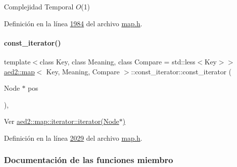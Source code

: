 \begin{DoxyDescription}
\item[Complejidad Temporal]$O$(1)
\end{DoxyDescription}

Definición en la línea \hyperlink{map_8h_source_l01984}{1984} del archivo \hyperlink{map_8h_source}{map.\+h}.

\mbox{\label{classaed2_1_1map_1_1const__iterator_a195d395708167dca23f9ce49f7c604f3_a195d395708167dca23f9ce49f7c604f3}} 
\paragraph{\texorpdfstring{const\+\_\+iterator()}{const\_iterator()}\hspace{0.1cm}{\footnotesize\ttfamily [3/3]}}
{\footnotesize\ttfamily template$<$class Key, class Meaning, class Compare = std\+::less$<$\+Key$>$$>$ \\
\hyperlink{classaed2_1_1map}{aed2\+::map}$<$ Key, Meaning, Compare $>$\+::const\+\_\+iterator\+::const\+\_\+iterator (\begin{DoxyParamCaption}\item[{Node $\ast$}]{pos }\end{DoxyParamCaption})\hspace{0.3cm}{\ttfamily [inline]}, {\ttfamily [private]}}



Ver \hyperlink{classaed2_1_1map_1_1iterator_ab0ea21abcb32b6d5a72cf341b9029838_ab0ea21abcb32b6d5a72cf341b9029838}{aed2\+::map\+::iterator\+::iterator(\+Node$\ast$)} 



Definición en la línea \hyperlink{map_8h_source_l02029}{2029} del archivo \hyperlink{map_8h_source}{map.\+h}.



\subsubsection{Documentación de las funciones miembro}
\mbox{\label{classaed2_1_1map_1_1const__iterator_a174e7b81e88253d936fb14512f00ef69_a174e7b81e88253d936fb14512f00ef69}} 
